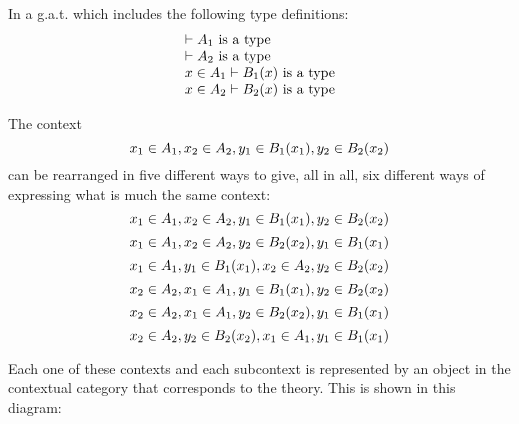 \documentclass[10pt,a4paper]{scrartcl}
\begin{document}
In a g.a.t. \gat which includes the following type definitions:
\begin{displaymath}
\begin{array}{l}
\vdash A_1\mbox{ is a type} \\
\vdash A_2\mbox{ is a type} \\
x \in A_1\vdash B_1(x)\mbox{ is a type} \\
x \in A_2\vdash B_2(x)\mbox{ is a type} \\
\end{array}
\end{displaymath}

The context 
\begin{equation}
x_1 \in A_1,x_2 \in A_2,y_1 \in B_1(x_1),y_2 \in B_2(x_2)
\end{equation}
can be rearranged in five different ways to give, all in all, six different ways of expressing
what is much the same context:
\begin{equation}
x_1 \in A_1, x_2 \in A_2, y_1 \in B_1(x_1), y_2 \in B_2(x_2)
\end{equation}
\begin{equation}
x_1 \in A_1, x_2 \in A_2, y_2 \in B_2(x_2), y_1 \in B_1(x_1)
\end{equation}
\begin{equation}
x_1 \in A_1, y_1 \in B_1(x_1), x_2 \in A_2, y_2 \in B_2(x_2)
\end{equation}
\begin{equation}
x_2 \in A_2, x_1 \in A_1, y_1 \in B_1(x_1), y_2 \in B_2(x_2)
\end{equation}
\begin{equation}
x_2 \in A_2, x_1 \in A_1, y_2 \in B_2(x_2), y_1 \in B_1(x_1)
\end{equation}
\begin{equation}
x_2 \in A_2, y_2 \in B_2(x_2), x_1 \in A_1, y_1 \in B_1(x_1)
\end{equation}


Each one of these contexts and each subcontext is represented by an object
in the contextual category   that corresponds to the theory. This is
shown in this diagram:
\end{document}
